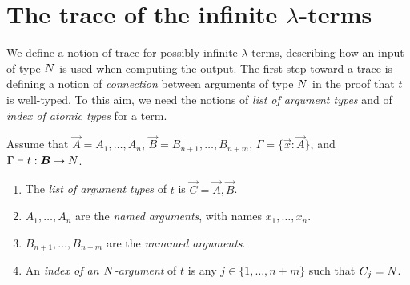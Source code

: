 
\section{The trace of the infinite $\lambda$-terms}
We define a notion of trace for possibly infinite $\lambda$-terms, 
describing how an input of type ${N}$ is used when computing the output.
The first step toward a trace is defining a notion of \emph{connection} between arguments
of type ${N}$ in the proof that $t$ is well-typed. 
To this aim, we need the notions of \emph{list of argument
 types} and of \emph{index of atomic types} for a term.

%
%


\begin{definition}
Assume that $\vec{A} = A_1, \ldots, A_n$, $\vec{B}=B_{n+1}, \ldots, B_{n+m}$, 
$\Gamma = \{\vec{x}:\vec{A}\}$,
and $\Gamma \vdash t: \vec{B} \rightarrow \N$.

\begin{enumerate}
\item
The \emph{list of argument types} of $t$ is $\vec{C} = \vec{A},\vec{B}$. 

\item
$A_1, \ldots, A_n$ are the \emph{named arguments}, with names $x_1, \ldots, x_n$.

\item
$B_{n+1}, \ldots, B_{n+m}$ are the \emph{unnamed arguments}.

\item
An \emph{index of an ${N}$-argument} 
of $t$ is any $j \in \{1, \ldots, n+m\}$ such that $C_j = {N}$.

\end{enumerate}
\end{definition}

